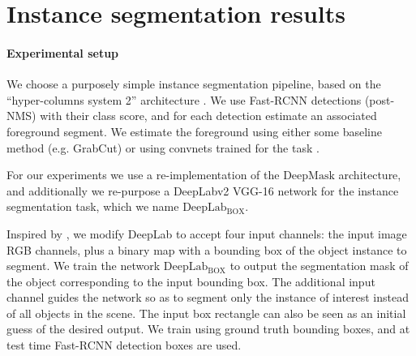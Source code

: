 \documentclass[10pt,english,british,twocolumn]{article}
\begin{document}
\section{\label{sec:Instance-segmentation-results}Instance segmentation results}

\paragraph{\label{sec:Instance-segmentation-setup}Experimental setup}

We choose a purposely simple instance segmentation pipeline, based
on the ``hyper-columns system 2'' architecture \cite{Hariharan2015Cvpr}.
We use Fast-RCNN \cite{Girshick2015IccvFastRCNN} detections (post-NMS)
with their class score, and for each detection estimate an associated
foreground segment. We estimate the foreground using either some baseline
method (e.g. GrabCut) or using convnets trained for the task \cite{Pinheiro2015Nips,Chen2016ArxivDeeplabv2}. 

For our experiments we use a re-implementation of the $\mathrm{DeepMask}$
\cite{Pinheiro2015Nips} architecture, and additionally we re-purpose
a Deep\-Lab\-v2 VGG-16 network \cite{Chen2016ArxivDeeplabv2} for
the instance segmentation task, which we name $\mathrm{DeepLab_{BOX}}$. 

Inspired by \cite{Xu2016Cvpr,Carreira2016Cvpr}, we modify Deep\-Lab
to accept four input channels: the input image RGB channels, plus
a binary map with a bounding box of the object instance to segment.
We train the network $\mathrm{DeepLab_{BOX}}$ to output the segmentation
mask of the object corresponding to the input bounding box. The additional
input channel guides the network so as to segment only the instance
of interest instead of all objects in the scene. The input box rectangle
can also be seen as an initial guess of the desired output. We train
using ground truth bounding boxes, and at test time Fast-RCNN detection
boxes are used. 
\end{document}
